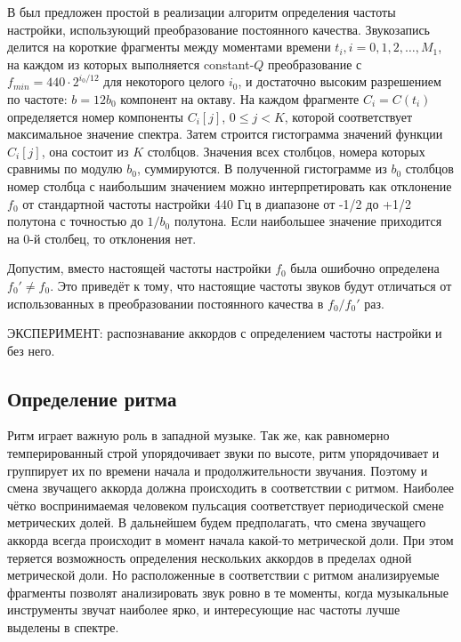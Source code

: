 В \cite{Zhu2005} был предложен простой в реализации алгоритм определения частоты
настройки, использующий преобразование постоянного качества. Звукозапись делится
на короткие фрагменты между моментами времени $t_i, i = 0, 1, 2, \dots, M_1$, на
каждом из которых выполняется constant-$Q$ преобразование с $f_{min} = 440 \cdot
2^{i_0/12}$ для некоторого целого $i_0$, и достаточно высоким разрешением по
частоте: $b = 12 b_0$ компонент на октаву. На каждом фрагменте $C_i = C(t_i)$
определяется номер компоненты $C_i[j]$, $0 \leq j < K$, которой соответствует
максимальное значение спектра. Затем строится гистограмма значений функции
$C_i[j]$, она состоит из $K$ столбцов. Значения всех столбцов, номера которых
сравнимы по модулю $b_0$, суммируются. В полученной гистограмме из $b_0$
столбцов номер столбца с наибольшим значением можно интерпретировать как
отклонение $f_0$ от стандартной частоты настройки 440 Гц в диапазоне от -1/2 до
+1/2 полутона с точностью до $1/b_0$ полутона. Если наибольшее значение
приходится на 0-й столбец, то отклонения нет.

Допустим, вместо настоящей частоты настройки $f_0$ была ошибочно определена
$f_0' \neq f_0$. Это приведёт к тому, что настоящие частоты звуков будут
отличаться от использованных в преобразовании постоянного качества в $f_0 /
f_0'$ раз.

ЭКСПЕРИМЕНТ: распознавание аккордов с определением частоты настройки и без него.

\subsection{Определение ритма} \label{ssect1_rhyhtm}

Ритм играет важную роль в западной музыке. Так же, как равномерно
темперированный строй упорядочивает звуки по высоте, ритм упорядочивает и
группирует их по времени начала и продолжительности звучания. Поэтому и смена
звучащего аккорда должна происходить в соответствии с ритмом. Наиболее чётко
воспринимаемая человеком пульсация соответствует периодической смене метрических
долей. В дальнейшем будем предполагать, что смена звучащего аккорда всегда
происходит в момент начала какой-то метрической доли. При этом теряется
возможность определения нескольких аккордов в пределах одной метрической доли.
Но расположенные в соответствии с ритмом анализируемые фрагменты позволят
анализировать звук ровно в те моменты, когда музыкальные инструменты звучат
наиболее ярко, и интересующие нас частоты лучше выделены в спектре.

